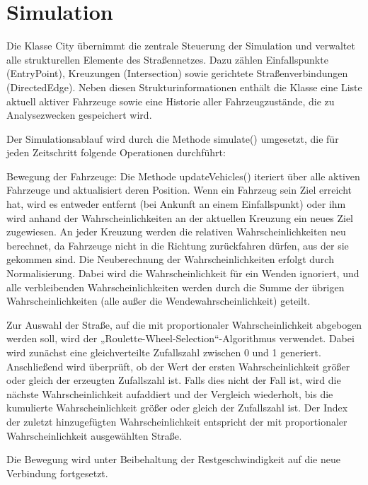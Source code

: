 \clearpage

\section{Simulation}

Die Klasse City übernimmt die zentrale Steuerung der Simulation und verwaltet alle strukturellen Elemente des Straßennetzes.
Dazu zählen Einfallspunkte (EntryPoint), Kreuzungen (Intersection) sowie gerichtete Straßenverbindungen (DirectedEdge).
Neben diesen Strukturinformationen enthält die Klasse eine Liste aktuell aktiver Fahrzeuge sowie eine Historie aller Fahrzeugzustände,
die zu Analysezwecken gespeichert wird.

Der Simulationsablauf wird durch die Methode simulate() umgesetzt,
die für jeden Zeitschritt folgende Operationen durchführt:

Bewegung der Fahrzeuge: Die Methode updateVehicles() iteriert über alle aktiven Fahrzeuge und aktualisiert deren Position.
Wenn ein Fahrzeug sein Ziel erreicht hat,
wird es entweder entfernt (bei Ankunft an einem Einfallspunkt) oder ihm wird anhand der Wahrscheinlichkeiten an der aktuellen Kreuzung ein neues Ziel zugewiesen.
An jeder Kreuzung werden die relativen Wahrscheinlichkeiten neu berechnet, da Fahrzeuge nicht in die Richtung zurückfahren dürfen, aus der sie gekommen sind.
Die Neuberechnung der Wahrscheinlichkeiten erfolgt durch Normalisierung. Dabei wird die Wahrscheinlichkeit für ein Wenden ignoriert,
und alle verbleibenden Wahrscheinlichkeiten werden durch die Summe der übrigen Wahrscheinlichkeiten (alle außer die Wendewahrscheinlichkeit) geteilt.

Zur Auswahl der Straße, auf die mit proportionaler Wahrscheinlichkeit abgebogen werden soll, wird der „Roulette-Wheel-Selection“-Algorithmus verwendet. 
Dabei wird zunächst eine gleichverteilte Zufallszahl zwischen 0 und 1 generiert. Anschließend wird überprüft, ob der Wert der ersten Wahrscheinlichkeit größer oder gleich der erzeugten Zufallszahl ist. 
Falls dies nicht der Fall ist, wird die nächste Wahrscheinlichkeit aufaddiert und der Vergleich wiederholt, bis die kumulierte Wahrscheinlichkeit größer oder gleich der Zufallszahl ist. 
Der Index der zuletzt hinzugefügten Wahrscheinlichkeit entspricht der mit proportionaler Wahrscheinlichkeit ausgewählten Straße.

Die Bewegung wird unter Beibehaltung der Restgeschwindigkeit auf die neue Verbindung fortgesetzt.

